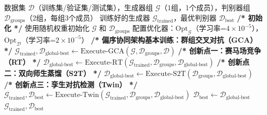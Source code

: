 \begin{algorithm}[H]
\caption{MGCA框架总体训练流程}
\label{alg:mgca}
\begin{algorithmic}[0]
\Require 数据集 $\mathcal{D}$（训练集/验证集/测试集），生成器组 $\mathcal{G}$（1组，1个成员），判别器组 $\mathcal{D}_{\text{groups}}$（2组，每组3个成员）
\Ensure 训练好的生成器 $\mathcal{G}_{\text{trained}}$，最优判别器 $\mathcal{D}_{\text{best}}$
\Statex
\State \textbf{/* 初始化 */}
\State 使用随机权重初始化 $\mathcal{G}$ 和 $\mathcal{D}_{\text{groups}}$
\State 配置优化器：$\text{Opt}_{\mathcal{G}}$（学习率=$4\times10^{-5}$），$\text{Opt}_{\mathcal{D}}$（学习率=$2\times10^{-5}$）
\Statex
\State \textbf{/* 偏序协同架构基本训练：群组交叉对抗（GCA） */}
\State $\mathcal{G}_{\text{trained}}, \mathcal{D}_{\text{global-best}} \gets \text{Execute-GCA}(\mathcal{G}, \mathcal{D}_{\text{groups}}, \mathcal{D})$
\Statex
\State \textbf{/* 创新点一：赛马场竞争（RT） */}
    \State $\mathcal{D}_{\text{global-best}} \gets \text{Execute-RT}(\mathcal{G}_{\text{trained}}, \mathcal{D}_{\text{groups}}, \mathcal{D}_{\text{global-best}})$
\EndIf
\Statex
\State \textbf{/* 创新点二：双向师生蒸馏（S2T） */}
    \State $\mathcal{D}_{\text{global-best}} \gets \text{Execute-S2T}(\mathcal{D}_{\text{groups}}, \mathcal{D}_{\text{global-best}})$
\EndIf
\Statex
\State \textbf{/* 创新点三：孪生对抗检测（Twin） */}
    \State $\mathcal{G}_{\text{trained}}, \mathcal{D}_{\text{best}} \gets \text{Execute-Twin}(\mathcal{G}_{\text{trained}}, \mathcal{D}_{\text{groups}}, \mathcal{D}_{\text{global-best}})$
\Else
    \State $\mathcal{D}_{\text{best}} \gets \mathcal{D}_{\text{global-best}}$
\EndIf
\Statex
\State \Return $\mathcal{G}_{\text{trained}}, \mathcal{D}_{\text{best}}$
\end{algorithmic}
\end{algorithm}

